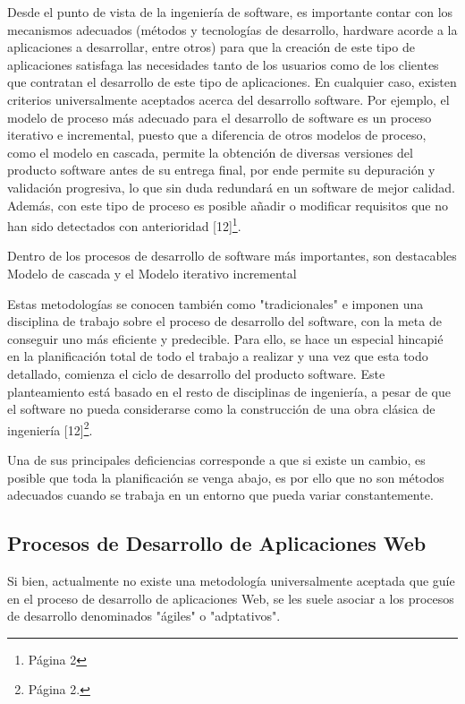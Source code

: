 Desde el punto de vista de la ingeniería de software, es importante contar con los mecanismos
adecuados (métodos y tecnologías de desarrollo, hardware acorde a la aplicaciones a desarrollar, entre
otros) para que la creación de este tipo de aplicaciones satisfaga las necesidades tanto de los usuarios 
como de los clientes que contratan el desarrollo de este tipo de aplicaciones.
En cualquier caso, existen criterios universalmente aceptados acerca del desarrollo software. Por ejemplo, 
el modelo de proceso más adecuado para el desarrollo de software es un proceso iterativo e incremental, 
puesto que a diferencia de otros modelos de proceso, como el modelo en cascada, permite la 
obtención de diversas versiones del producto software antes de su entrega final, por ende permite su depuración 
y validación progresiva, lo que sin duda redundará en un software de mejor calidad. Además, con este tipo de proceso es 
posible añadir o modificar requisitos que no han sido detectados con anterioridad [12]\footnote{Página 2}.

Dentro de los procesos de desarrollo de software más importantes, son destacables Modelo de cascada y el Modelo iterativo incremental

Estas metodologías se conocen también como "tradicionales" e imponen una disciplina de trabajo 
sobre el proceso de desarrollo del software, con la meta de conseguir uno más eficiente y predecible.
Para ello, se hace un especial hincapié en la planificación total de todo el trabajo a realizar y
una vez que esta todo detallado, comienza el ciclo de desarrollo del producto software. Este
planteamiento está basado en el resto de disciplinas de ingeniería, a pesar de que el software
no pueda considerarse como la construcción de una obra clásica de ingeniería [12]\footnote{Página 2.}.

Una de sus principales deficiencias corresponde a que si existe un cambio, es posible que toda la planificación se 
venga abajo, es por ello que no son métodos adecuados cuando se trabaja en un entorno que pueda variar constantemente.


\subsection{Procesos de Desarrollo de Aplicaciones Web}

Si bien, actualmente no existe una metodología universalmente aceptada que guíe en el proceso de desarrollo de 
aplicaciones Web, se les suele asociar a los procesos de desarrollo denominados "ágiles" o "adptativos". %

